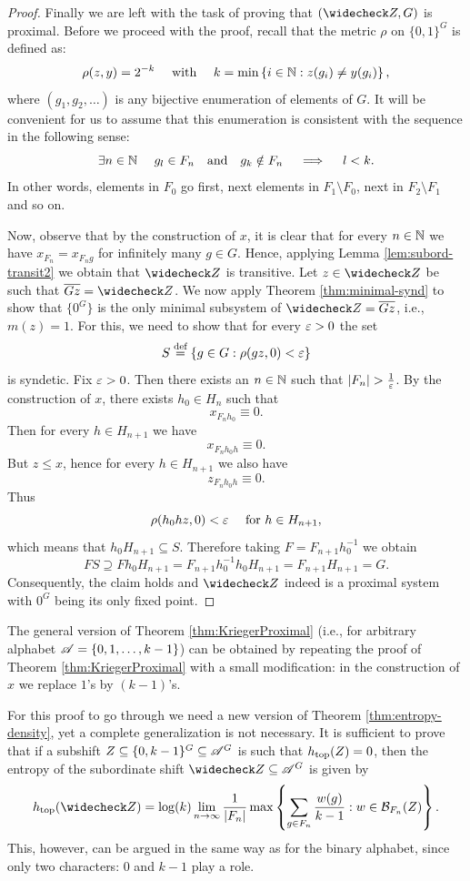 \begin{proof}
Finally we are left with the task of proving that $(\subord{Z},G)$ is proximal.
%
Before we proceed with the proof, recall that the metric $\rho$ on $\{0,1\}^G$ is defined as:
\[
\rho(z,y)=2^{-k}\quad\text{ with } \quad k= \min\left\{i\in\mathbb{N}: z(g_i)\neq y(g_i)\right\},
\]
where $(g_1,g_2,\ldots)$ is any bijective enumeration of elements of $G$. It will be convenient for us to assume that this enumeration is consistent with the \Folner sequence in the following sense:
\[
 \exists n\in\mathbb{N}~~~~ g_l\in F_n~~ \mbox{ and }~~ g_k\notin F_n \quad \implies \quad l<k.
\]
In other words, elements in $F_0$ go first, next elements in $F_1\setminus F_0$, next in $F_2\setminus F_1$ and so on.

Now, observe that by the construction of $x$, it is clear that for every $n\in \mathbb{N}$ we have $x_{F_n}=x_{F_ng}$ for infinitely many $g\in G$. 
%
Hence, applying Lemma \ref{lem:subord-transit2} we obtain that $\subord{Z}$ is transitive.
%
Let $z\in\subord{Z}$ be such that $\closure{Gz}=\subord{Z}$.
%
We now apply Theorem \ref{thm:minimal-synd} to show that $\{0^G\}$ is the only minimal subsystem of $\subord{Z}=\closure{Gz}$, i.e., $m(z)=1$. 
%
For this, we need to show that for every $\varepsilon>0$ the set 
\[
S\stackrel{\textup{def}}{=}\left\{g\in G: \rho(gz,0)< \varepsilon\right\}
\]
is syndetic. Fix $\varepsilon>0$. Then there exists an $n\in\mathbb{N}$ such that $|F_n|>\frac{1}{\eps}$.
%
By the construction of $x$, there exists $h_0\in H_n$ such that 
\[
x_{F_nh_0}\equiv 0.
\]
Then for every $h\in H_{n+1}$ we have
\[
x_{F_nh_0h}\equiv 0.
\]
But $z\leq x$, hence for every $h\in H_{n+1}$ we also have
\[
z_{F_nh_0h}\equiv 0.
\]
Thus
\[
\rho(h_0hz,0)<\varepsilon \quad \text{ for } h\in H_{n+1},
\]
which means that $h_0H_{n+1}\subseteq S$. Therefore taking $F=F_{n+1}h_0^{-1}$ we obtain
\[
FS\supseteq Fh_0H_{n+1}=F_{n+1}h_0^{-1}h_0H_{n+1}=F_{n+1}H_{n+1}=G. 
\]
\noindent Consequently, the claim holds and $\subord{Z}$ indeed is a proximal system with $0^G$ being its only fixed point. 
\end{proof}

\begin{rem}\label{rem:prox_realiz_general}
%
The general version of Theorem \ref{thm:KriegerProximal} (i.e., for arbitrary alphabet $\mathscr{A}=\{0,1,\ldots, k-1\}$) can be obtained by repeating the proof of Theorem \ref{thm:KriegerProximal} with a small modification: in the construction of $x$ we replace $1$'s by $(k-1)$'s. 

For this proof to go through we need a new version of Theorem \ref{thm:entropy-density}, yet a complete generalization is not necessary. It is sufficient to prove that if a subshift $Z\subseteq\{0,k-1\}^G \subseteq \mathscr{A}^G$ is such that $h_\mathrm{top}(Z)=0$, then the entropy of the subordinate shift $\subord{Z}\subseteq\alf^G$ is given by
\[
\htop(\subord{Z})=\log (k)\lim_{n\to\infty}\frac{1}{|F_n|}\max\inbrace{\sum_{g\in F_n} \frac{w(g)}{k-1}: w\in \mathcal B_{F_n}(Z)}.
\]
This, however, can be argued in the same way as for the binary alphabet, since only two characters: $0$ and $k-1$ play a role.
\end{rem}



